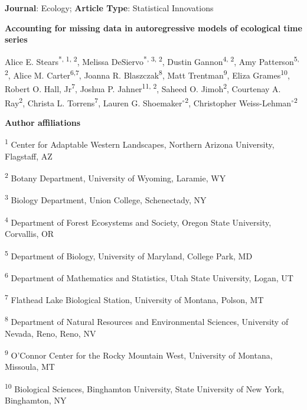 \documentclass[12pt,english]{article} %
\begin{document}
\noindent\textbf{Journal}: Ecology; \textbf{Article Type}: Statistical Innovations

{\Large \noindent \bf %
Accounting for missing data in autoregressive models of ecological time series
}


\medskip

\noindent Alice E. Stears\textsuperscript{*, 1, 2}, 
Melissa DeSiervo\textsuperscript{*, 3, 2},
Dustin Gannon\textsuperscript{4, 2},
Amy Patterson\textsuperscript{5, 2},
Alice M. Carter\textsuperscript{6,7},
Joanna R. Blaszczak\textsuperscript{8},
Matt Trentman\textsuperscript{9},
Eliza Grames\textsuperscript{10},
Robert O. Hall, Jr\textsuperscript{7},
Joshua P. Jahner\textsuperscript{11, 2},
Saheed O. Jimoh\textsuperscript{2},
Courtenay A. Ray\textsuperscript{2},
Christa L. Torrens\textsuperscript{7},
Lauren G. Shoemaker$^{\circ}$\textsuperscript{2},
Christopher Weiss-Lehman$^{\circ}$\textsuperscript{2}

\noindent\noindent \textbf{Author affiliations}

\noindent\textsuperscript{1} Center for Adaptable Western Landscapes, Northern Arizona University, Flagstaff, AZ

\noindent\textsuperscript{2} Botany Department, University of Wyoming, Laramie, WY

\noindent\textsuperscript{3} Biology Department, Union College, Schenectady, NY

\noindent\textsuperscript{4} Department of Forest Ecosystems and Society, Oregon State University, Corvallis, OR 

\noindent\textsuperscript{5} Department of Biology, University of Maryland, College Park, MD

\noindent\textsuperscript{6} Department of Mathematics and Statistics, Utah State University, Logan, UT

\noindent\textsuperscript{7} Flathead Lake Biological Station, University of Montana, Polson, MT

\noindent\textsuperscript{8} Department of Natural Resources and Environmental Sciences, University of Nevada, Reno, Reno, NV

\noindent\textsuperscript{9} O’Connor Center for the Rocky Mountain West, University of Montana, Missoula, MT

\noindent\textsuperscript{10} Biological Sciences, Binghamton University, State University of New York, Binghamton, NY
\end{document}
